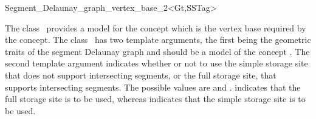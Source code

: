 

\begin{ccRefClass}{Segment_Delaunay_graph_vertex_base_2<Gt,SSTag>}


\ccDefinition

The class \ccRefName\ provides a model for the
 concept which is the vertex
base required by the 
concept. The class \ccRefName\ has two template arguments, the first
being the geometric traits of the segment Delaunay graph and should be a
model of the concept .
The second template argument indicates whether
or not to use the simple storage site that does not support
intersecting segments, or the full storage site, that supports
intersecting segments. The possible values are 
and .  indicates that the
full storage site is to be used, whereas 
indicates that the simple storage site is to be used.



\ccIsModel
{}






\end{ccRefClass}
